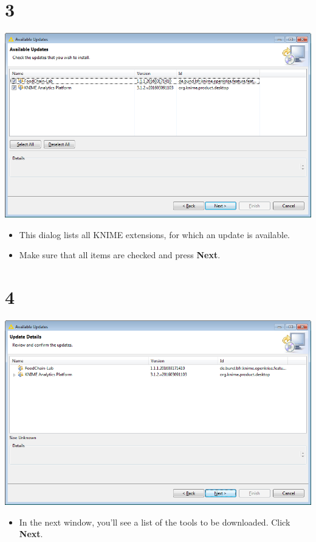 \documentclass{beamer}
\begin{document}
\section{3}
\begin{frame}
	\begin{center}
  		\includegraphics[height=0.6\textheight]{3.png}
	\end{center}
	\begin{itemize}
		\item This dialog lists all KNIME extensions, for which an update is available.
		\item Make sure that all items are checked and press \textbf{Next}.
	\end{itemize}
\end{frame}

\section{4}
\begin{frame}
	\begin{center}
  		\includegraphics[height=0.6\textheight]{4.png}
	\end{center}
	\begin{itemize}
		\item In the next window, you’ll see a list of the tools to be downloaded. Click \textbf{Next}.
	\end{itemize}
\end{frame}
\end{document}
